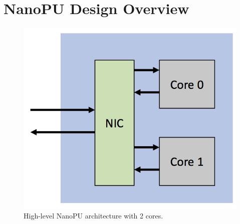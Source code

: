 \section{NanoPU Design Overview}
\begin{figure}
  \includegraphics[width=0.75\linewidth]{./figures/NanoPU}
  \caption{High-level NanoPU architecture with 2 cores.}
  \label{fig:NanoPU}
\end{figure}
